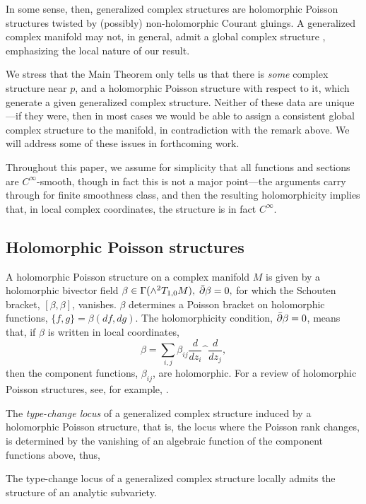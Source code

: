 \documentclass{article}
\begin{document}
In some sense, then, generalized complex structures are holomorphic Poisson structures twisted by (possibly) non-holomorphic Courant gluings.  A generalized complex manifold may not, in general, admit a global complex structure \cite{CavalcantiGualtieri2007} \cite{CavalcantiGualtieri}, emphasizing the local nature of our result.

\begin{rem}
We stress that the Main Theorem only tells us that there is \emph{some} complex structure near $p$, and a holomorphic Poisson structure with respect to it, which generate a given generalized complex structure.  Neither of these data are unique---if they were, then in most cases we would be able to assign a consistent global complex structure to the manifold, in contradiction with the remark above.  We will address some of these issues in forthcoming work.
\end{rem}

\begin{rem}
Throughout this paper, we assume for simplicity that all functions and sections are $C^\infty$-smooth, though in fact this is not a major point---the arguments carry through for finite smoothness class, and then the resulting holomorphicity implies that, in local complex coordinates, the structure is in fact $C^\infty$.
\end{rem}

\subsection{Holomorphic Poisson structures}\label{holomorphic Poisson}

A holomorphic Poisson structure on a complex manifold $M$ is given by a holomorphic bivector field $\beta \in \Gamma(\wedge ^2 T_{1,0}M),\; \bar{\partial}\beta=0,$ for which the Schouten bracket, $[\beta,\beta]$, vanishes.  $\beta$ determines a Poisson bracket on holomorphic functions, $\{f,g\} = \beta(df,dg)$.  The holomorphicity condition, $\bar{\partial}\beta=0$, means that, if $\beta$ is written in local coordinates,
$$\beta = \sum_{i,j} \beta_{ij} \frac{d}{dz_i}\^\frac{d}{dz_j},$$
then the component functions, $\beta_{ij}$, are holomorphic.  For a review of holomorphic Poisson structures, see, for example, \cite{LSX}.

The \emph{type-change locus} of a generalized complex structure induced by a holomorphic Poisson structure, that is, the locus where the Poisson rank changes, is determined by the vanishing of an algebraic function of the component functions above, thus,
\begin{cor}
The type-change locus of a generalized complex structure locally admits the structure of an analytic subvariety.
\end{cor}
\end{document}
